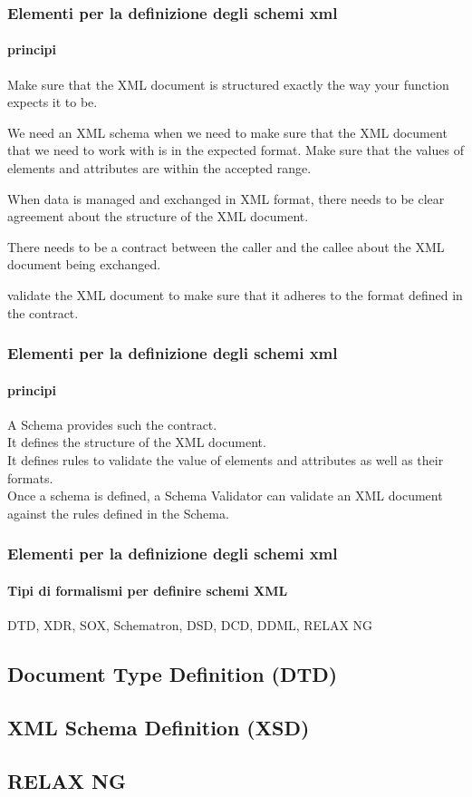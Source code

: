 \begin{frame}
    \frametitle{Elementi per la definizione degli schemi xml}
    \framesubtitle{principi}
    \addtocounter{nframe}{1}

    Make sure that the XML document is structured exactly the way your function expects it to be.

   We need an XML schema when we need to make sure that the XML document that we need to work with is in the expected format.
   Make sure that the values of elements and attributes are within the accepted range.

   When data is managed and exchanged in XML format, there needs to be clear agreement about the structure of the XML document.

   There needs to be a contract between the caller and the callee about the XML document being exchanged.

   validate the XML document to make sure that it adheres to the format defined in the contract.


\end{frame}



\begin{frame}
    \frametitle{Elementi per la definizione degli schemi xml}
    \framesubtitle{principi}
    \addtocounter{nframe}{1}

    A Schema provides such the contract. 
    \\ It defines the structure of the XML document. 
    \\ It defines rules to validate the value of elements and attributes as well as their formats. 
    \\ Once a schema is defined, a Schema Validator can validate an XML document against the rules defined in the Schema.


\end{frame}


\begin{frame}
    \frametitle{Elementi per la definizione degli schemi xml}
    \framesubtitle{Tipi di formalismi per definire schemi XML}
    \addtocounter{nframe}{1}

   DTD, XDR, SOX, Schematron, DSD, DCD, DDML, RELAX NG

\end{frame}

\subsection{Document Type Definition (DTD)}


\subsection{XML Schema Definition (XSD)}
%

\subsection{RELAX NG}
%